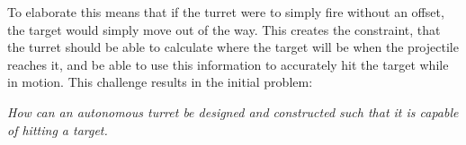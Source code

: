 To elaborate this means that if the turret were to simply fire without an
offset, the target would simply move out of the way. This creates the
constraint, that the turret should be able to calculate where the target will be
when the projectile reaches it, and be able to use this information to
accurately hit the target while in motion. This challenge results in the initial
problem:

\begin{center}
\begin{minipage}{0.8\linewidth}
\textit{How can an autonomous turret be designed and constructed such that it is
capable of hitting a target.}
\end{minipage}
\end{center}
